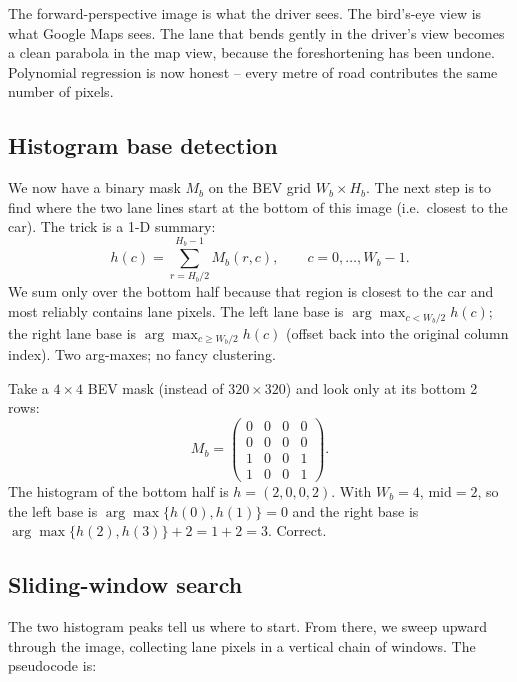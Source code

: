 \begin{intuition}
The forward-perspective image is what the driver sees. The bird's-eye
view is what Google Maps sees. The lane that bends gently in the
driver's view becomes a clean parabola in the map view, because the
foreshortening has been undone. Polynomial regression is now honest --
every metre of road contributes the same number of pixels.
\end{intuition}

\subsection{Histogram base detection}

We now have a binary mask $M_b$ on the BEV grid $W_b\times H_b$. The
next step is to find where the two lane lines start at the bottom of
this image (i.e.\ closest to the car). The trick is a 1-D summary:
\[
h(c) = \sum_{r=H_b/2}^{H_b-1} M_b(r,c),\qquad c=0,\ldots,W_b-1.
\]
We sum only over the bottom half because that region is closest to
the car and most reliably contains lane pixels. The left lane base is
$\arg\max_{c<W_b/2} h(c)$; the right lane base is
$\arg\max_{c\ge W_b/2} h(c)$ (offset back into the original column
index). Two arg-maxes; no fancy clustering.

\begin{example}
Take a $4\times 4$ BEV mask (instead of $320\times 320$) and look only
at its bottom 2 rows:
\[
M_b = \begin{pmatrix}
0 & 0 & 0 & 0\\
0 & 0 & 0 & 0\\
1 & 0 & 0 & 1\\
1 & 0 & 0 & 1
\end{pmatrix}.
\]
The histogram of the bottom half is $h=(2,0,0,2)$. With $W_b=4$,
$\text{mid}=2$, so the left base is $\arg\max\{h(0),h(1)\}=0$ and the
right base is $\arg\max\{h(2),h(3)\}+2=1+2=3$. Correct.
\end{example}

\subsection{Sliding-window search}

The two histogram peaks tell us where to start. From there, we sweep
upward through the image, collecting lane pixels in a vertical chain
of windows. The pseudocode is:

